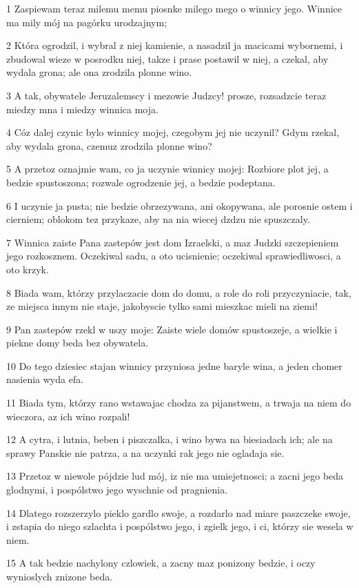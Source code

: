 \par 1 Zaspiewam teraz milemu memu piosnke milego mego o winnicy jego. Winnice ma mily mój na pagórku urodzajnym;
\par 2 Która ogrodzil, i wybral z niej kamienie, a nasadzil ja macicami wybornemi, i zbudowal wieze w posrodku niej, takze i prase postawil w niej, a czekal, aby wydala grona; ale ona zrodzila plonne wino.
\par 3 A tak, obywatele Jeruzalemscy i mezowie Judzcy! prosze, rozsadzcie teraz miedzy mna i miedzy winnica moja.
\par 4 Cóz dalej czynic bylo winnicy mojej, czegobym jej nie uczynil? Gdym rzekal, aby wydala grona, czemuz zrodzila plonne wino?
\par 5 A przetoz oznajmie wam, co ja uczynie winnicy mojej: Rozbiore plot jej, a bedzie spustoszona; rozwale ogrodzenie jej, a bedzie podeptana.
\par 6 I uczynie ja pusta; nie bedzie obrzezywana, ani okopywana, ale porosnie ostem i cierniem; oblokom tez przykaze, aby na nia wiecej dzdzu nie spuszczaly.
\par 7 Winnica zaiste Pana zastepów jest dom Izraelski, a maz Judzki szczepieniem jego rozkosznem. Oczekiwal sadu, a oto ucisnienie; oczekiwal sprawiedliwosci, a oto krzyk.
\par 8 Biada wam, którzy przylaczacie dom do domu, a role do roli przyczyniacie, tak, ze miejsca innym nie staje, jakobyscie tylko sami mieszkac mieli na ziemi!
\par 9 Pan zastepów rzekl w uszy moje: Zaiste wiele domów spustoszeje, a wielkie i piekne domy beda bez obywatela.
\par 10 Do tego dziesiec stajan winnicy przyniosa jedne baryle wina, a jeden chomer nasienia wyda efa.
\par 11 Biada tym, którzy rano wstawajac chodza za pijanstwem, a trwaja na niem do wieczora, az ich wino rozpali!
\par 12 A cytra, i lutnia, beben i piszczalka, i wino bywa na biesiadach ich; ale na sprawy Panskie nie patrza, a na uczynki rak jego nie ogladaja sie.
\par 13 Przetoz w niewole pójdzie lud mój, iz nie ma umiejetnosci; a zacni jego beda glodnymi, i pospólstwo jego wyschnie od pragnienia.
\par 14 Dlatego rozszerzylo pieklo gardlo swoje, a rozdarlo nad miare paszczeke swoje, i zstapia do niego szlachta i pospólstwo jego, i zgielk jego, i ci, którzy sie wesela w niem.
\par 15 A tak bedzie nachylony czlowiek, a zacny maz ponizony bedzie, i oczy wynioslych znizone beda.
